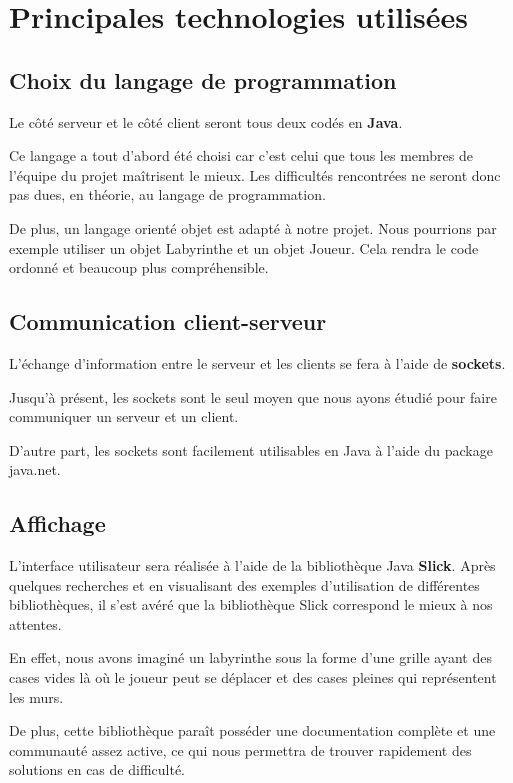 \section{Principales technologies utilisées}
\subsection{Choix du langage de programmation}
Le côté serveur et le côté client seront tous deux codés en \textbf{Java}.

Ce langage a tout d'abord été choisi car c'est celui que tous les membres de l'équipe du projet maîtrisent le mieux. Les difficultés rencontrées ne seront donc pas dues, en théorie, au langage de programmation.

De plus, un langage orienté objet est adapté à notre projet. Nous pourrions par exemple utiliser un objet Labyrinthe et un objet Joueur. Cela rendra le code ordonné et beaucoup plus compréhensible.

\subsection{Communication client-serveur}
L'échange d'information entre le serveur et les clients se fera à l'aide de \textbf{sockets}.

Jusqu'à présent, les sockets sont le seul moyen que nous ayons étudié pour faire communiquer un serveur et un client.

D'autre part, les sockets sont facilement utilisables en Java à l'aide du package java.net.

\subsection{Affichage}
L'interface utilisateur sera réalisée à l'aide de la bibliothèque Java \textbf{Slick}. Après quelques recherches et en visualisant des exemples d'utilisation de différentes bibliothèques, il s'est avéré que la bibliothèque Slick correspond le mieux à nos attentes.

En effet, nous avons imaginé un labyrinthe sous la forme d'une grille ayant des cases vides là où le joueur peut se déplacer et des cases pleines qui représentent les murs.

De plus, cette bibliothèque paraît posséder une documentation complète et une communauté assez active, ce qui nous permettra de trouver rapidement des solutions en cas de difficulté.

